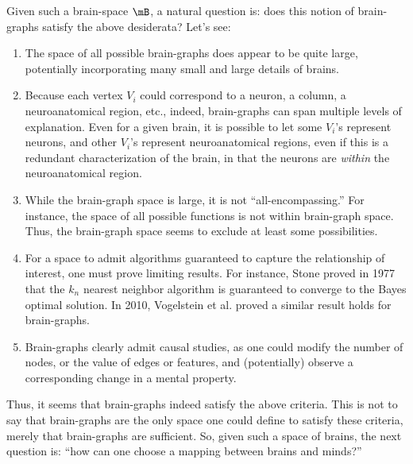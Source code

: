 Given such a brain-space $\mB$, a natural question is: does this notion of brain-graphs satisfy the above desiderata? Let's see:

\begin{enumerate}
	\item The space of all possible brain-graphs does appear to be quite large, potentially incorporating many small and large details of brains.
	\item Because each vertex $V_i$ could correspond to a neuron, a column, a neuroanatomical region, etc., indeed, brain-graphs can span multiple levels of explanation.  Even for a given brain, it is possible to let some $V_i$'s represent neurons, and other $V_i$'s represent neuroanatomical regions, even if this is a redundant characterization of the brain, in that the neurons are \emph{within} the neuroanatomical region.
	\item While the brain-graph space is large, it is not ``all-encompassing.''  For instance, the space of all possible functions is not within brain-graph space. Thus, the brain-graph space seems to exclude at least some possibilities.
	\item For a space to admit algorithms guaranteed to capture the relationship of interest, one must prove limiting results.  For instance, Stone proved in 1977 \cite{Stone77} that the $k_n$ nearest neighbor algorithm is guaranteed to converge to the Bayes optimal solution.  In 2010, Vogelstein et al. \cite{VogelsteinPriebe10} proved a similar result holds for brain-graphs.
	\item Brain-graphs clearly admit causal studies, as one could modify the number of nodes, or the value of edges or features, and (potentially) observe a corresponding change in a mental property.  
\end{enumerate}

Thus, it seems that brain-graphs indeed satisfy the above criteria.  This is not to say that brain-graphs are the only space one could define to satisfy these criteria, merely that brain-graphs are sufficient. So, given such a space of brains, the next question is: ``how can one choose a mapping between brains and minds?''



